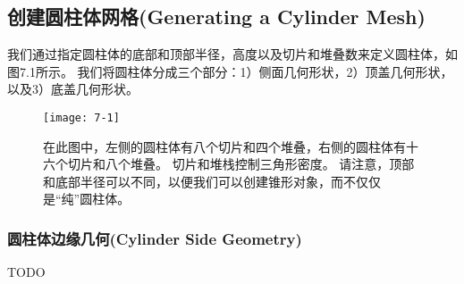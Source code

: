 \subsection{创建圆柱体网格(Generating a Cylinder Mesh)}
\begin{flushleft}
我们通过指定圆柱体的底部和顶部半径，高度以及切片和堆叠数来定义圆柱体，如图7.1所示。 我们将圆柱体分成三个部分：1）侧面几何形状，2）顶盖几何形状，以及3）底盖几何形状。
\end{flushleft}
\begin{figure}[h]
    \texttt{[image: 7-1]}
    \centering
    \caption{在此图中，左侧的圆柱体有八个切片和四个堆叠，右侧的圆柱体有十六个切片和八个堆叠。 切片和堆栈控制三角形密度。 请注意，顶部和底部半径可以不同，以便我们可以创建锥形对象，而不仅仅是“纯”圆柱体。}
    \label{fig:7-1}
\end{figure}

\subsubsection{圆柱体边缘几何(Cylinder Side Geometry)}
TODO